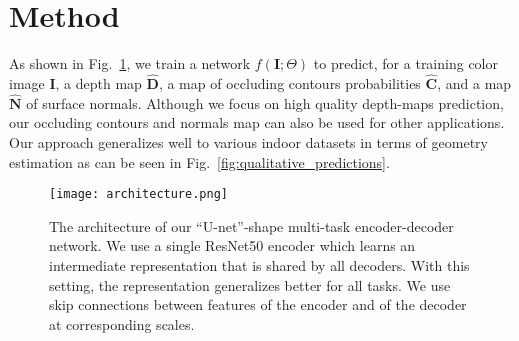 \documentclass[10pt,twocolumn,letterpaper]{article}
\begin{document}
\section{Method}


\newcommand{\bhC}{\widehat{\boldsymbol{C}}}
\newcommand{\hCi}{\widehat{C}_i}
\newcommand{\bhD}{\widehat{\boldsymbol{D}}}
\newcommand{\hDi}{\widehat{D}_i}
\newcommand{\bhN}{\widehat{\boldsymbol{N}}}
\newcommand{\bhNi}{\widehat{\boldsymbol{N}}_i}

\newcommand{\bC}{\boldsymbol{C}}
\newcommand{\bD}{\boldsymbol{D}}
\newcommand{\bI}{\boldsymbol{I}}
\newcommand{\bN}{\boldsymbol{N}}
\newcommand{\bM}{\boldsymbol{M}}
\newcommand{\bX}{\boldsymbol{X}}
\newcommand{\bn}{\boldsymbol{n}}
\newcommand{\bu}{\boldsymbol{u}}

\newcommand{\calL}{\mathcal{L}}

\newcommand{\normals}{\text{n}}
\newcommand{\depth}{\text{d}}
\newcommand{\boundaries}{\text{c}}
\newcommand{\superv}{\text{superv}}
\newcommand{\dc}{\text{dc}}
\newcommand{\dn}{\text{dn}}
\newcommand{\BerHu}{\text{BerHu}}
\newcommand{\Huber}{\text{Huber}}
\newcommand{\AL}{\text{AL}}

\newcommand{\IR}{\mathbb{R}}

As shown in  Fig.~\ref{fig:architecture}, we train a  network $f(\bI;\Theta)$ to
predict,  for a  training  color image  $\bI$,  a  depth map  $\bhD$, a map of
occluding contours probabilities $\bhC$, and  a map  $\bhN$ of surface normals. 
Although we focus on high quality depth-maps prediction, our occluding 
contours and normals map can also be used for other applications. Our approach 
generalizes well to various indoor datasets in terms of geometry estimation as 
can be seen in Fig.~\ref{fig:qualitative_predictions}.

\begin{figure}[H]
	\begin{center}
\texttt{[image: architecture.png]}
\end{center}
	\caption{The architecture of our ``U-net''-shape \cite{Unet} multi-task 
	encoder-decoder network. We use a single ResNet50 encoder which learns an 
	intermediate representation that is shared by all decoders. With this 
	setting, the representation generalizes better for all tasks. 
		We use skip connections between features of the encoder and of the decoder at corresponding scales.
		}
	\label{fig:architecture}
\end{figure}
\end{document}
